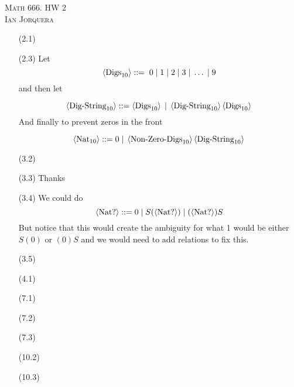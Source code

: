 \documentclass[12pt]{amsart}
\begin{document}
\begin{center}
    \textsc{Math 666. HW 2\\ Ian Jorquera}
\end{center}
\vspace{1em}

\begin{itemize}
    \item[(2.1)]
    \item[(2.3)] 
    Let \[\left\langle \text{Digs}_{10} \right\rangle::= \;0\;|\;1\; | \;2\;|\;3\;|\;\dots\; |\; 9\] 
    and then let 
    
    \[\left\langle \text{Dig-String}_{10} \right\rangle::=\left\langle \text{Digs}_{10} \right\rangle\;|\;\left\langle \text{Dig-String}_{10} \right\rangle\left\langle \text{Digs}_{10} \right\rangle\] And finally to prevent zeros in the front

    \[\left\langle \text{Nat}_{10} \right\rangle::= 0\;|\;\left\langle \text{Non-Zero-Digs}_{10} \right\rangle\left\langle \text{Dig-String}_{10} \right\rangle\]

    \item[(3.2)]
    

    \item[(3.3)] Thanks
    \item[(3.4)] We could do
    \[\left\langle \text{Nat?} \right\rangle::= 0\;|\;S(\left\langle \text{Nat?} \right\rangle)\;|\; (\left\langle \text{Nat?} \right\rangle)S\]
    But notice that this would create the ambiguity for what 1 would be either $S(0)$ or $(0)S$ and we would need to add relations to fix this.

    \item[(3.5)]
    

    \item[(4.1)]

    \item[(7.1)]
    \item[(7.2)]
    \item[(7.3)]
    
    \item[(10.2)]
    \item[(10.3)]

\end{itemize}
\end{document}
